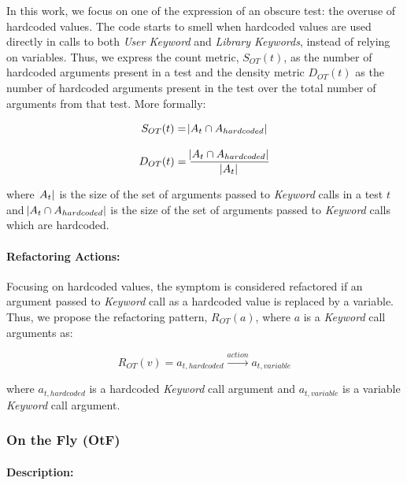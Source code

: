 In this work, we focus on one of the expression of an obscure test: the overuse of hardcoded values. The code starts to smell when hardcoded values are used directly in calls to both \emph{User Keyword} and \emph{Library Keywords}, instead of relying on variables. Thus, we express the count metric, $S_{OT}(t)$, as the number of hardcoded arguments present in a test and the density metric $D_{OT}(t)$ as the number of hardcoded arguments present in the test over the total number of arguments from that test. More formally:

\begin{equation*}
    S_{OT}(t) = \abs{A_{t} \cap A_{hardcoded}}
\end{equation*}

\begin{equation*}
    D_{OT}(t) = \frac{\abs{A_{t} \cap A_{hardcoded}}}{\abs{A_t}}
\end{equation*}

where $\abs{A_t}$ is the size of the set of arguments passed to \emph{Keyword} calls in a test $t$ and $\abs{A_{t} \cap A_{hardcoded}}$ is the size of the set of arguments passed to \emph{Keyword} calls which are hardcoded.

\paragraph{Refactoring Actions:}

Focusing on hardcoded values, the symptom is considered refactored if an argument passed to \emph{Keyword} call as a hardcoded value is replaced by a variable. Thus, we propose the refactoring pattern, $R_{OT}(a)$, where $a$ is a \emph{Keyword} call arguments as:

\begin{equation*}
    R_{OT}(v) = a_{t, hardcoded} \xrightarrow{action} a_{t, variable}
\end{equation*}

where $a_{t, hardcoded}$ is a hardcoded \emph{Keyword} call argument and $a_{t, variable}$ is a variable \emph{Keyword} call argument.

\subsubsection{On the Fly (OtF)}
\paragraph{Description:}

